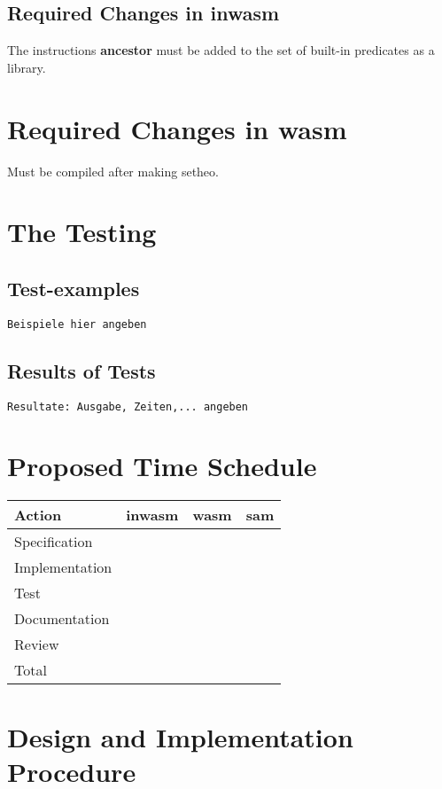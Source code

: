 \subsection{Required Changes in inwasm}

The instructions {\bf ancestor} must be added to the set of
built-in predicates as a library.

\section{Required Changes in wasm}

Must be compiled after making setheo.

\section{The Testing}
\subsection{Test-examples}
{\tt Beispiele hier angeben}

\subsection{Results of Tests}
{\tt Resultate: Ausgabe, Zeiten,... angeben}

\section{Proposed Time Schedule}

\begin{center}
\begin{tabular}{|l|r|r|r|}
\hline\hline
Action & inwasm & wasm & sam \\
\hline
Specification & & & \\
Implementation & & & \\
Test & & & \\
Documentation & & & \\
Review & & & \\
\hline
Total & & & \\
\hline\hline
\end{tabular}
\end{center}


\section{Design and Implementation Procedure}

